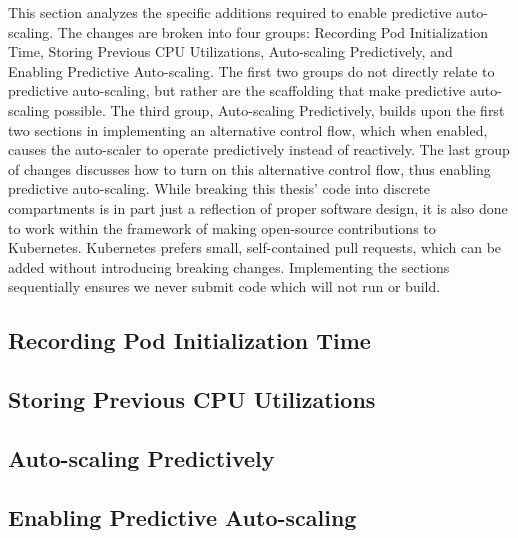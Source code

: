 This section analyzes the specific additions required to enable predictive auto-scaling.
The changes are broken into four groups: Recording Pod Initialization Time,
Storing Previous CPU Utilizations, Auto-scaling Predictively, and Enabling
Predictive Auto-scaling. The first two groups do not directly relate to
predictive auto-scaling, but rather are the scaffolding that make predictive
auto-scaling possible. The third group, Auto-scaling Predictively, builds upon
the first two sections in implementing an alternative control flow, which when
enabled, causes the auto-scaler to operate predictively instead of reactively.
The last group of changes discusses how to turn on this alternative control
flow, thus enabling predictive auto-scaling. While breaking this thesis' code
into discrete compartments is in part just a reflection of proper software design,
it is also done to work within the framework of making open-source contributions
to Kubernetes. Kubernetes prefers small, self-contained pull requests, which can
be added without introducing breaking changes. Implementing the sections sequentially ensures
we never submit code which will not run or build.

\subsection{Recording Pod Initialization Time}



\subsection{Storing Previous CPU Utilizations}



\subsection{Auto-scaling Predictively}
\label{autoscaling-predictively}



\subsection{Enabling Predictive Auto-scaling}


